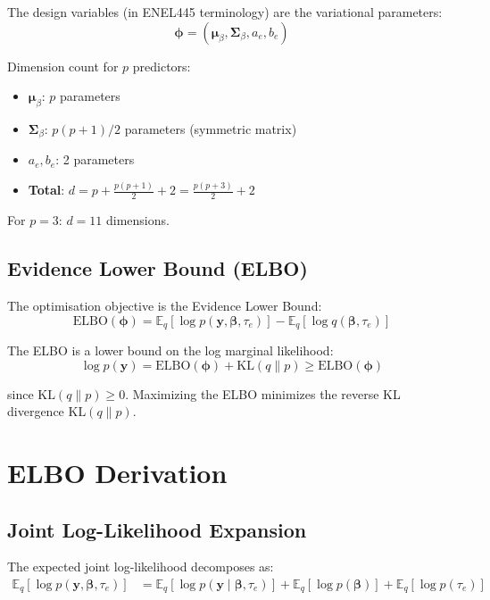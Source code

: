 \documentclass[11pt]{article}
\newcommand{\E}{\mathbb{E}}
\newcommand{\KL}{\text{KL}}
\newcommand{\ELBO}{\text{ELBO}}
\begin{document}
The design variables (in ENEL445 terminology) are the variational parameters:
\begin{equation}
\bm{\phi} = (\bm{\mu}_\beta, \bm{\Sigma}_\beta, a_e, b_e)
\end{equation}

Dimension count for $p$ predictors:
\begin{itemize}
\item $\bm{\mu}_\beta$: $p$ parameters
\item $\bm{\Sigma}_\beta$: $p(p+1)/2$ parameters (symmetric matrix)
\item $a_e, b_e$: 2 parameters
\item \textbf{Total}: $d = p + \frac{p(p+1)}{2} + 2 = \frac{p(p+3)}{2} + 2$
\end{itemize}

For $p=3$: $d = 11$ dimensions.

\subsection{Evidence Lower Bound (ELBO)}

The optimisation objective is the Evidence Lower Bound:
\begin{equation}
\ELBO(\bm{\phi}) = \E_{q}[\log p(\bm{y}, \bm{\beta}, \tau_e)] - \E_{q}[\log q(\bm{\beta}, \tau_e)]
\label{eq:elbo_def}
\end{equation}

The ELBO is a lower bound on the log marginal likelihood:
\begin{equation}
\log p(\bm{y}) = \ELBO(\bm{\phi}) + \KL(q \| p) \geq \ELBO(\bm{\phi})
\end{equation}

since $\KL(q \| p) \geq 0$. Maximizing the ELBO minimizes the reverse KL divergence $\KL(q \| p)$.

\section{ELBO Derivation}

\subsection{Joint Log-Likelihood Expansion}

The expected joint log-likelihood decomposes as:
\begin{align}
\E_{q}[\log p(\bm{y}, \bm{\beta}, \tau_e)] &= \E_{q}[\log p(\bm{y} \mid \bm{\beta}, \tau_e)] + \E_{q}[\log p(\bm{\beta})] + \E_{q}[\log p(\tau_e)]
\end{align}
\end{document}
